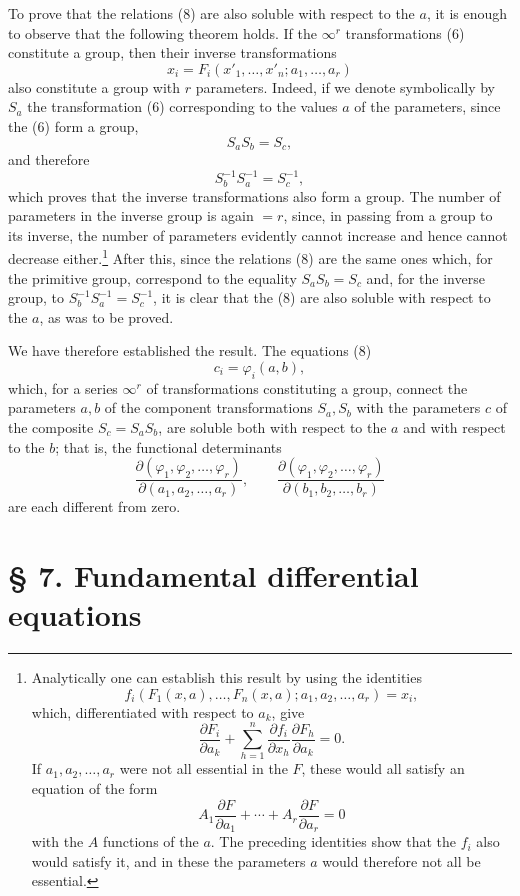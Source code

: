 \documentclass[11pt]{book}
\begin{document}
To prove that the relations (8) are also soluble with respect to the $a$, it is enough to observe that the following theorem holds. If the $\infty^r$ transformations (6) constitute a group, then their inverse transformations
\[
 x_i=F_i(x'_1,\ldots,x'_n;a_1,\ldots,a_r)
\]
also constitute a group with $r$ parameters. Indeed, if we denote symbolically by $S_a$ the transformation (6) corresponding to the values $a$ of the parameters, since the (6) form a group,
\[
 S_aS_b=S_c,
\]
and therefore
\[
 S_b^{-1}S_a^{-1}=S_c^{-1},
\]
which proves that the inverse transformations also form a group. The number of parameters in the inverse group is again $=r$, since, in passing from a group to its inverse, the number of parameters evidently cannot increase and hence cannot decrease either.\footnote{Analytically one can establish this result by using the identities
\[
 f_i(F_1(x,a),\ldots,F_n(x,a);a_1,a_2,\ldots,a_r)=x_i,
\]
which, differentiated with respect to $a_k$, give
\[
 \frac{\partial F_i}{\partial a_k}+\sum\limits_{h=1}^n\frac{\partial f_i}{\partial x_h}\frac{\partial F_h}{\partial a_k}=0.
\]
If $a_1,a_2,\ldots,a_r$ were not all essential in the $F$, these would all satisfy an equation of the form
\[
 A_1\frac{\partial F}{\partial a_1}+\cdots+A_r\frac{\partial F}{\partial a_r}=0
\]
with the $A$ functions of the $a$. The preceding identities show that the $f_i$ also would satisfy it, and in these the parameters $a$ would therefore not all be essential.}
After this, since the relations (8) are the same ones which, for the primitive group, correspond to the equality $S_aS_b=S_c$ and, for the inverse group, to $S_b^{-1}S_a^{-1}=S_c^{-1}$, it is clear that the (8) are also soluble with respect to the $a$, as was to be proved.

We have therefore established the result. The equations (8)
\[
 c_i=\varphi_i(a,b),
\]
which, for a series $\infty^r$ of transformations constituting a group, connect the parameters $a,b$ of the component transformations $S_a,S_b$ with the parameters $c$ of the composite $S_c=S_aS_b$, are soluble both with respect to the $a$ and with respect to the $b$; that is, the functional determinants
\[
 \frac{\partial(\varphi_1,\varphi_2,\ldots,\varphi_r)}{\partial(a_1,a_2,\ldots,a_r)},
 \qquad
 \frac{\partial(\varphi_1,\varphi_2,\ldots,\varphi_r)}{\partial(b_1,b_2,\ldots,b_r)}
\]
are each different from zero.


\section*{\S{} 7. Fundamental differential equations}
\end{document}
